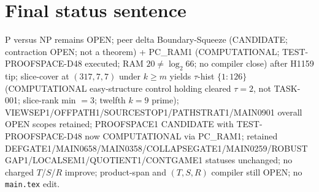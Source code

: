 \documentclass[11pt]{article}
\begin{document}
\section*{Final status sentence}
P versus NP remains OPEN; peer delta Boundary-Squeeze (CANDIDATE; contraction OPEN; not a theorem) + PC\_RAM1 (COMPUTATIONAL; TEST-PROOFSPACE-D48 executed; RAM $20\neq\log_2 66$; no compiler close) after H1159 tip; slice-cover at $(317,7,7)$ under $k{\ge}m$ yields $\tau$-hist $\{1{:}126\}$ (COMPUTATIONAL easy-structure control holding cleared $\tau{=}2$, not TASK-001; slice-rank min $=3$; twelfth $k{=}9$ prime); VIEWSEP1/OFFPATH1/SOURCESTOP1/PATHSTRAT1/MAIN0901 overall OPEN scopes retained; PROOFSPACE1 CANDIDATE with TEST-PROOFSPACE-D48 now COMPUTATIONAL via PC\_RAM1; retained DEFGATE1/MAIN0658/MAIN0358/COLLAPSEGATE1/MAIN0259/ROBUSTGAP1/LOCALSEM1/QUOTIENT1/CONTGAME1 statuses unchanged; no charged $T$/$S$/$R$ improve; product-span and $(T,S,R)$ compiler still OPEN; no \texttt{main.tex} edit.
\end{document}

